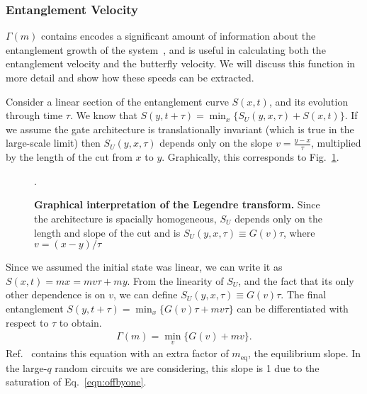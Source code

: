 \subsubsection{Entanglement Velocity} \label{subsub:v_E }

$\Gamma(m)$ contains encodes a significant amount of information about the entanglement growth of the system~\cite{Jonay18}, and is useful in calculating both the entanglement velocity and the butterfly velocity. We will discuss this function in more detail and show how these speeds can be extracted.

Consider a linear section of the entanglement curve $S(x,t)$, and its evolution through time $\tau$. We know that $S(y,t+\tau) = \min_x\{S_U(y,x,\tau) + S(x,t)\}$. If we assume the gate architecture is translationally invariant (which is true in the large-scale limit) then $S_U(y,x,\tau)$ depends only on the slope $v = \frac{y-x}{\tau}$, multiplied by the length of the cut from $x$ to $y$. Graphically, this corresponds to Fig.~\ref{fig:legendre}.
\begin{figure}
	\centering
	
	\caption{\textbf{Graphical interpretation of the Legendre transform.} Since the architecture is spacially homogeneous, $S_U$ depends only on the length and slope of the cut and is $S_U(y,x,\tau) \equiv G(v)\tau$, where $v=(x-y)/\tau$}.
	\label{fig:legendre}
\end{figure}
Since we assumed the initial state was linear, we can write it as $S(x,t) = mx = mv\tau+my$. From the linearity of $S_U$, and the fact that its only other dependence is on $v$, we can define $S_U(y,x,\tau) \equiv G(v)\tau$. The final entanglement $S(y,t+\tau) = \min_x\{G(v)\tau + mv\tau\}$ can be differentiated with respect to $\tau$ to obtain.
\begin{align}
\Gamma(m) = \min_v\{G(v) + mv\}.
\end{align}
Ref.~\cite{Jonay18} contains this equation with an extra factor of $m_\text{eq}$, the equilibrium slope. In the large-$q$ random circuits we are considering, this slope is 1 due to the saturation of Eq.~\ref{eqn:offbyone}.

